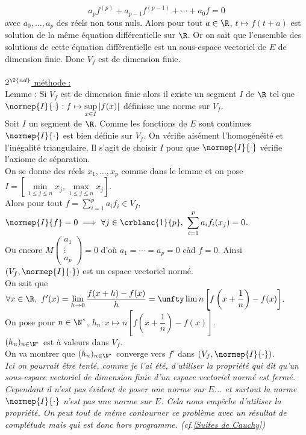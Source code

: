 \documentclass{book}
\begin{document}
	$$a_pf^{(p)}+a_{p-1}f^{(p-1)}+\cdots+a_0f=0$$
	avec $a_0,\dots,a_p$ des réels non tous nuls. Alors pour tout $a\in \R$, $t\mapsto f(t+a)$ est solution de la même équation différentielle sur $\R$. Or on sait que l'ensemble des solutions de cette équation différentielle est un sous-espace vectoriel de $E$ de dimension finie. Donc $V_f$ est de dimension finie.\\\\
	\underline{$2^{\T{nd}}$ méthode :}\\
	Lemme : Si $V_f$ est de dimension finie alors il existe un segment $I$ de $\R$ tel que $\normep{I}{\cdot}:f\mapsto \sup\limits_{x\in I}|f(x)|$ définisse une norme sur $V_f$.\\
	Soit $I$ un segment de $\R$. Comme les fonctions de $E$ sont continues $\normep{I}{\cdot}$ est bien définie sur $V_f$. On vérifie aisément l'homogénéité et l'inégalité triangulaire. Il s'agit de choisir $I$ pour que $\normep{I}{\cdot}$ vérifie l'axiome de séparation.\\
	On se donne des réels $x_1,\dots,x_p$ comme dans le lemme et on pose $I=\left[\min\limits_{1\leq j\leq n}x_j,\max\limits_{1\leq j\leq n}x_j\right]$.\\
	Alors pour tout $f=\displaystyle\sum_{i=1}^pa_if_i\in V_f$, $\normep{I}{f}=0\implies \forall j\in \crblanc{1}{p},\ \displaystyle\sum_{i=1}^pa_if_i(x_j)=0$.\\
	Ou encore $M\begin{pmatrix}a_1\\\vdots\\a_p\end{pmatrix}=0$ d'où $a_1=\cdots=a_p=0$ càd $f=0$.
	Ainsi $(V_f,\normep{I}{\cdot})$ est un espace vectoriel normé.\\
	On sait que $\forall x\in \R,\ f'(x)=\displaystyle\lim_{h\to 0}\frac{f(x+h)-f(x)}{h}=\unfty\lim n\left[f\left(x+\frac{1}{n}\right)-f(x)\right]$.\\
	On pose pour $n\in \N^*$, $h_n:x\mapsto n\left[f\left(x+\dfrac{1}{n}\right)-f(x)\right]$.\\
	$(h_n)_{n\in \N^*}$ est à valeurs dans $V_f$.\\
	On va montrer que $(h_n)_{n\in \N^*}$ converge vers $f'$ dans $(V_f,\normep{I}{\cdot})$.\\
	\textit{Ici on pourrait être tenté, comme je l'ai été, d'utiliser la propriété qui dit qu'un sous-espace vectoriel de dimension finie d'un espace vectoriel normé est fermé. Cependant il n'est pas évident de poser une norme sur $E$... et surtout la norme $\normep{I}{\cdot}$ n'est pas une norme sur $E$. Cela nous empêche d'utiliser la propriété. On peut tout de même contourner ce problème avec un résultat de complétude mais qui est donc hors programme. (cf.\ref{Suites de Cauchy})}\\
\end{document}
